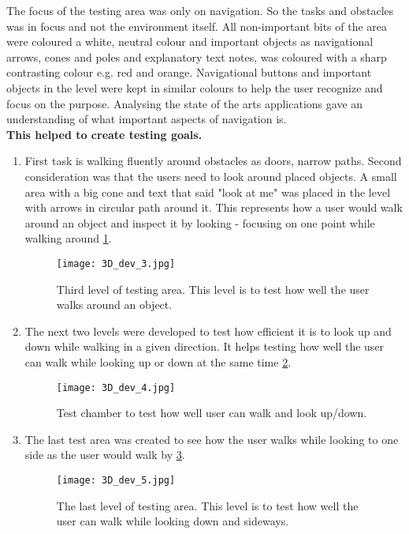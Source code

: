 The focus of the testing area was only on navigation. So the tasks and obstacles was in focus and not the environment itself. All non-important bits of the area were coloured a white, neutral colour and important objects as navigational arrows, cones and poles and explanatory text notes, was coloured with a sharp contrasting colour e.g. red and orange. Navigational buttons and important objects in the level were kept in similar colours to help the user recognize and focus on the purpose. 
Analysing the state of the arts applications gave an understanding of what important aspects of navigation is.
\\
  \textbf{This helped to create testing goals.} 
\begin {enumerate}
\item First task is walking fluently around obstacles as doors, narrow paths. Second consideration was that the users need to look around placed objects. A small area with a big cone and text that said "look at me" was placed in the level with arrows in circular path around it. This represents how a user would walk around an object and inspect it by looking - focusing on one point while walking around \ref{TestLevel3}.

\begin{figure}[H]
\centering
\texttt{[image: 3D\_dev\_3.jpg]}
\caption{Third level of testing area. This level is to test how well the user walks around an object.}
\label{TestLevel3}
\end{figure}

\item The next two levels were developed to test how efficient it is to look up and down while walking in a given direction. It helps testing how well the user can walk while looking up or down at the same time \ref{TestLevel4}.

\begin{figure}[H]
\centering
\texttt{[image: 3D\_dev\_4.jpg]}
\caption{Test chamber to test how well user can walk and look up/down.}
\label{TestLevel4}
\end{figure}

\item The last test area was created to see how the user walks while looking to one side as the user would walk by \ref{TestLevel5}.

\begin{figure}[H]
\centering
\texttt{[image: 3D\_dev\_5.jpg]}
\caption{The last level of testing area. This level is to test how well the user can walk while looking down and sideways.}
\label{TestLevel5}
\end{figure}
\end{enumerate} 

